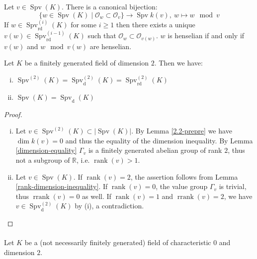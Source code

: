 \begin{lemma}\label{2.2-pre}
Let $v\in\operatorname{Spv}(K)$. There is a canonical bijection:
\[\{ w\in\operatorname{Spv}(K)\mid \mathcal{O}_w\subset\mathcal{O}_v \} \to \operatorname{Spv}k(v),\ w\mapsto w\mod v\]
If $w\in\operatorname{Spv}_\text{rd}^{(i)}(K)$ for some $i\geq 1$ then there exists a unique $v(w)\in\operatorname{Spv}_\text{rd}^{(i-1)}(K)$ such that $\mathcal{O}_w\subset\mathcal{O}_{v(w)}$. $w$ is henselian if and only if $v(w)$ and $w\mod v(w)$ are henselian.
\end{lemma}

\begin{lemma}\label{lemma-spvd}
Let $K$ be a finitely generated field of dimension $2$. Then we have:
\begin{enumerate}[(i)]
\item $\operatorname{Spv}^{(2)}(K) = \operatorname{Spv}^{(2)}_\text{d}(K) = \operatorname{Spv}^{(2)}_\text{rd}(K)$
\item $\operatorname{Spv}(K) = \operatorname{Spv}_\text{d}(K)$
\end{enumerate}
\end{lemma}

\begin{proof}
\begin{enumerate}[(i)]
\item Let $v\in\operatorname{Spv}^{(2)}(K)\subset |\operatorname{Spv}(K)|$. By Lemma \ref{2.2-prepre} we have $\dim k(v) = 0$ and thus the equality of the dimension inequality. By Lemma \ref{dimension-equality} $\Gamma_v$ is a finitely generated abelian group of rank $2$, thus not a subgroup of $\mathbb{R}$, i.e. $\operatorname{rank}(v)> 1$. 
\item Let $v\in\operatorname{Spv}(K)$. If $\operatorname{rank}(v) = 2$, the assertion follows from Lemma \ref{rank-dimension-inequality}. If $\operatorname{rank}(v) = 0$, the value group $\Gamma_v$ is trivial, thus $\operatorname{rrank}(v) = 0$ as well. If $\operatorname{rank}(v) = 1$ and $\operatorname{rrank}(v) = 2$, we have $v\in\operatorname{Spv}^{(2)}_\text{d}(K)$ by (i), a contradiction. \qedhere
\end{enumerate}
\end{proof}

\paragraph{} Let $K$ be a (not necessarily finitely generated) field of characteristic $0$ and dimension $2$.

